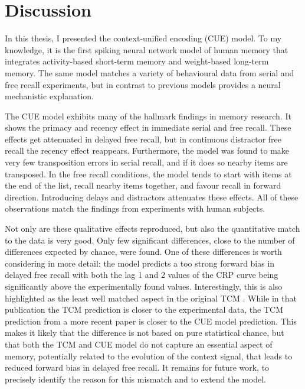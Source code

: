 \chapter{Discussion}
In this thesis, I presented the context-unified encoding (CUE) model.
To my knowledge, it is the first spiking neural network model of human memory that integrates activity-based short-term memory and weight-based long-term memory.
The same model matches a variety of behavioural data from serial and free recall experiments, but in contrast to previous models provides a neural mechanistic explanation.

The CUE model exhibits many of the hallmark findings in memory research.
It shows the primacy and recency effect in immediate serial and free recall.
These effects get attenuated in delayed free recall, but in continuous distractor free recall the recency effect reappears.
Furthermore, the model was found to make very few transposition errors in serial recall, and if it does so nearby items are transposed.
In the free recall conditions, the model tends to start with items at the end of the list, recall nearby items together, and favour recall in forward direction.
Introducing delays and distractors attenuates these effects.
All of these observations match the findings from experiments with human subjects.

Not only are these qualitative effects reproduced, but also the quantitative match to the data is very good.
Only few significant differences, close to the number of differences expected by chance, were found.
One of these differences is worth considering in more detail: the model predicts a too strong forward bias in delayed free recall with both the lag \num{1} and \num{2} values of the CRP curve being significantly above the experimentally found values.
Interestingly, this is also highlighted as the least well matched aspect in the original TCM \parencite{Howard2002}.
While in that publication the TCM prediction is closer to the experimental data, the TCM prediction from a more recent paper \parencite{Sederberg2008} is closer to the CUE model prediction.
This makes it likely that the difference is not based on pure statistical chance, but that both the TCM and CUE model do not capture an essential aspect of memory, potentially related to the evolution of the context signal, that leads to reduced forward bias in delayed free recall.
It remains for future work, to precisely identify the reason for this mismatch and to extend the model.

